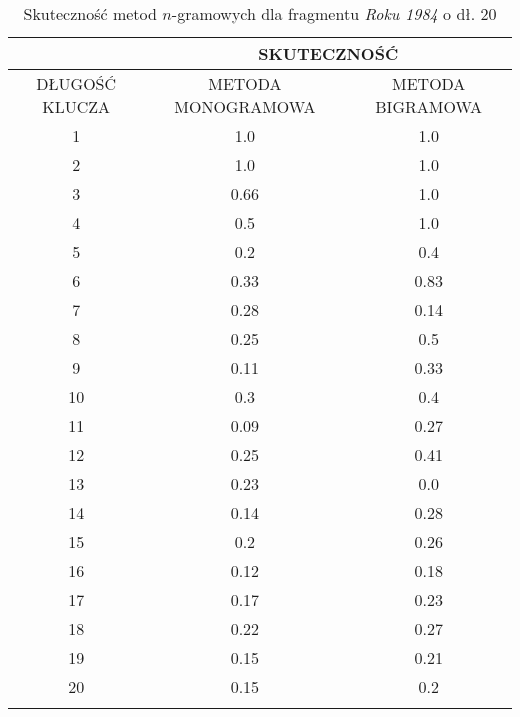 \documentclass[a4paper]{article}
\theoremstyle{defn}
\theoremstyle{theorem}
\theoremstyle{lemma}
\theoremstyle{cor}
\theoremstyle{fact}
\begin{document}
\begin{center}\begin{longtable}{
|c|c|c|}
\hline   &\multicolumn{2}{|c|}{SKUTECZNOŚĆ} \\
\hline  DŁUGOŚĆ KLUCZA & METODA MONOGRAMOWA & METODA BIGRAMOWA\\ \hline
1
 & 1.0 & 1.0\\ \hline
2
 & 1.0 & 1.0\\ \hline
3
 & 0.66 & 1.0\\ \hline
4
 & 0.5 & 1.0\\ \hline
5
 & 0.2 & 0.4\\ \hline
6
 & 0.33 & 0.83\\ \hline
7
 & 0.28 & 0.14\\ \hline
8
 & 0.25 & 0.5\\ \hline
9
 & 0.11 & 0.33\\ \hline
10
 & 0.3 & 0.4\\ \hline
11
 & 0.09 & 0.27\\ \hline
12
 & 0.25 & 0.41\\ \hline
13
 & 0.23 & 0.0\\ \hline
14
 & 0.14 & 0.28\\ \hline
15
 & 0.2 & 0.26\\ \hline
16
 & 0.12 & 0.18\\ \hline
17
 & 0.17 & 0.23\\ \hline
18
 & 0.22 & 0.27\\ \hline
19
 & 0.15 & 0.21\\ \hline
20
 & 0.15 & 0.2\\ \hline
 \caption{Skuteczność metod $n$-gramowych dla fragmentu \textit{Roku 1984} o dł. 20}
\end{longtable}\end{center}
\end{document}
